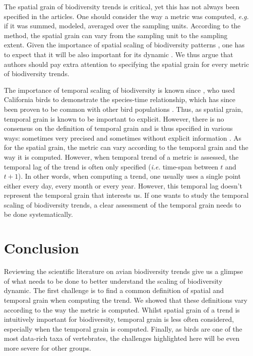 \documentclass[
  12pt,
  oneside]{report}
\begin{document}
The spatial grain of biodiversity trends is critical, yet this has not always been specified in the articles. One should consider the way a metric was computed, \emph{e.g.} if it was summed, modeled, averaged over the sampling units. According to the method, the spatial grain can vary from the sampling unit to the sampling extent. Given the importance of spatial scaling of biodiversity patterns \autocite{storch_untangling_2004}, one has to expect that it will be also important for its dynamic \autocite[\emph{e.g.}][]{chase_species_2019}. We thus argue that authors should pay extra attention to specifying the spatial grain for every metric of biodiversity trends.

The importance of temporal scaling of biodiversity is known since \textcite{grinnell_role_1922}, who used California birds to demonstrate the species-time relationship, which has since been proven to be common with other bird populations \autocite{white_two-phase_2004}. Thus, as spatial grain, temporal grain is known to be important to explicit. However, there is no consensus on the definition of temporal grain and is thus specified in various ways: sometimes very precised \autocite[\emph{e.g.} time of each census point, as in][]{schipper_contrasting_2016} and sometimes without explicit information \autocite[\emph{e.g.}][`The sites are visited twice a year (April to early May and late May to June), during which volunteers walk two parallel 1-km-long transect lines {[}\ldots{]}']{harrison_assessing_2014}. As for the spatial grain, the metric can vary according to the temporal grain and the way it is computed. However, when temporal trend of a metric is assessed, the temporal lag of the trend is often only specified (\emph{i.e.} time-span between \(t\) and \(t+1\)). In other words, when computing a trend, one usually uses a single point either every day, every month or every year. However, this temporal lag doesn't represent the temporal grain that interests us. If one wants to study the temporal scaling of biodiversity trends, a clear assessment of the temporal grain needs to be done systematically.

\hypertarget{conclusion}{%
\chapter{Conclusion}\label{conclusion}}

Reviewing the scientific literature on avian biodiversity trends give us a glimpse of what needs to be done to better understand the scaling of biodiversity dynamic. The first challenge is to find a common definition of spatial and temporal grain when computing the trend. We showed that these definitions vary according to the way the metric is computed. Whilst spatial grain of a trend is intuitively important for biodiversity, temporal grain is less often considered, especially when the temporal grain is computed. Finally, as birds are one of the most data-rich taxa of vertebrates, the challenges highlighted here will be even more severe for other groups.
\end{document}
